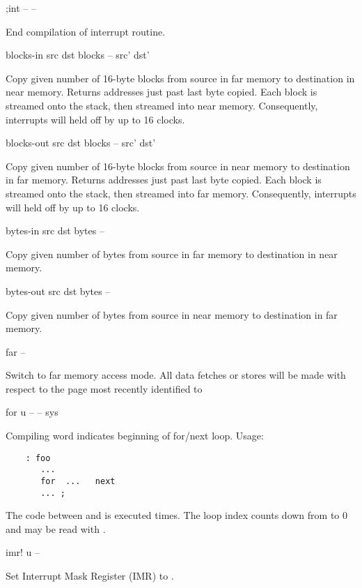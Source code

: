 \begin{cgloss}{;int}{ -- }{ -- }

End compilation of interrupt routine.
\end{cgloss}
\begin{gloss}{blocks-in}{ src dst blocks -- src' dst'}

Copy given number of 16-byte blocks from source in far memory to
destination in near memory.  Returns addresses just past last byte copied.
Each block is streamed onto the stack, then streamed into near memory.
Consequently, interrupts will held off by up to 16 clocks.
\end{gloss}
\begin{gloss}{blocks-out}{ src dst blocks -- src' dst'}

Copy given number of 16-byte blocks from source in near memory to
destination in far memory.  Returns addresses just past last byte copied.
Each block is streamed onto the stack, then streamed into far memory.
Consequently, interrupts will held off by up to 16 clocks.
\end{gloss}
\begin{gloss}{bytes-in}{ src dst bytes -- }

Copy given number of bytes from source in far memory to destination
in near memory.
\end{gloss}
\begin{gloss}{bytes-out}{ src dst bytes -- }

Copy given number of bytes from source in near memory to destination
in far memory.
\end{gloss}
\begin{gloss}{far}{ -- }

Switch to far memory access mode.  All data fetches or stores will be
made with respect to the page most recently identified to 
\end{gloss}
\begin{cgloss}{for}{ u -- }{ -- sys}

Compiling word indicates beginning of for/next loop.  Usage:
\begin{verbatim}
	: foo
	   ...
	   for  ...   next
	   ... ;
\end{verbatim}
The code between  and  is executed 
times.  The loop index counts down from  to 0
and may be read with .
\end{cgloss}
\begin{gloss}{imr!}{ u -- }

Set Interrupt Mask Register (IMR) to .
\end{gloss}
